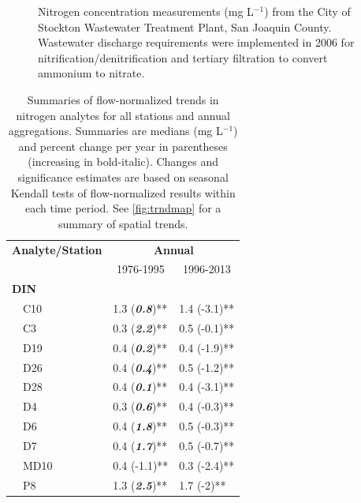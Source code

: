 \documentclass[journal = esthag, manuscript = article]{achemso}\usepackage[]{graphicx}\usepackage[]{color}
\begin{document}
\begin{suppinfo}
\begin{figure}[!ht]
{}

\caption[Nitrogen concentration measurements (mg L$^{-1}$) from the City of Stockton Wastewater Treatment Plant, San Joaquin County]{Nitrogen concentration measurements (mg L$^{-1}$) from the City of Stockton Wastewater Treatment Plant, San Joaquin County.  Wastewater discharge requirements were implemented in 2006 for nitrification/denitrification and tertiary filtration to convert ammonium to nitrate.}\label{fig:stock}
\end{figure}



\begin{table}[!tbp]
\caption{Summaries of flow-normalized trends in nitrogen analytes for all stations and annual aggregations.  Summaries are  medians (mg L$^{-1}$) and percent change per year in parentheses (increasing in bold-italic). Changes and significance estimates are based on seasonal Kendall tests of flow-normalized results within each time period. See \cref{fig:trndmap} for a summary of spatial trends.\label{tab:trndsann}} 
\begin{center}
\begin{tabular}{lll}
\hline\hline
\multicolumn{1}{l}{\bfseries Analyte/Station}&\multicolumn{2}{c}{\bfseries Annual}\tabularnewline
\cline{2-3}
\multicolumn{1}{l}{}&\multicolumn{1}{c}{1976-1995}&\multicolumn{1}{c}{1996-2013}\tabularnewline
\hline
{\bfseries DIN}&&\tabularnewline
~~C10&1.3 \footnotesize{(\textit{\textbf{0.8}})**}&1.4 \footnotesize{(-3.1)**}\tabularnewline
~~C3&0.3 \footnotesize{(\textit{\textbf{2.2}})**}&0.5 \footnotesize{(-0.1)**}\tabularnewline
~~D19&0.4 \footnotesize{(\textit{\textbf{0.2}})**}&0.4 \footnotesize{(-1.9)**}\tabularnewline
~~D26&0.4 \footnotesize{(\textit{\textbf{0.4}})**}&0.5 \footnotesize{(-1.2)**}\tabularnewline
~~D28&0.4 \footnotesize{(\textit{\textbf{0.1}})**}&0.4 \footnotesize{(-3.1)**}\tabularnewline
~~D4&0.3 \footnotesize{(\textit{\textbf{0.6}})**}&0.4 \footnotesize{(-0.3)**}\tabularnewline
~~D6&0.4 \footnotesize{(\textit{\textbf{1.8}})**}&0.5 \footnotesize{(-0.3)**}\tabularnewline
~~D7&0.4 \footnotesize{(\textit{\textbf{1.7}})**}&0.5 \footnotesize{(-0.7)**}\tabularnewline
~~MD10&0.4 \footnotesize{(-1.1)**}&0.3 \footnotesize{(-2.4)**}\tabularnewline
~~P8&1.3 \footnotesize{(\textit{\textbf{2.5}})**}&1.7 \footnotesize{(-2)**}\tabularnewline

\end{tabular}
\end{center}
\end{table}
\end{suppinfo}
\end{document}
